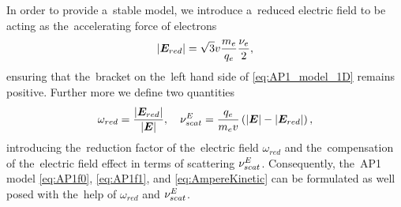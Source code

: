 In order to provide a~stable model, we introduce a~reduced electric field
to be acting as the~accelerating force of electrons
\begin{equation}
  |\boldsymbol{E}_{red}| = \sqrt{3} v\frac{m_e}{q_e}\frac{\nu_{e}}{2} ,
  \label{eq:Elimit}
\end{equation}
ensuring that the~bracket on the~left hand side of \eqref{eq:AP1_model_1D}
remains positive. Further more we define two quantities
\begin{equation}
  \omega_{red} = \frac{|\boldsymbol{E}_{red}|}{|\boldsymbol{E}|} ,\quad 
  \nu_{scat}^E = \frac{q_e}{m_ev} \left(|\boldsymbol{E}| - |\boldsymbol{E}_{red}|\right),
  \nonumber
\end{equation}
introducing the~reduction factor of the~electric field
$\omega_{red}$ and the~compensation of the~electric field effect in terms of
scattering $\nu_{scat}^E$. Consequently, the~AP1 model \eqref{eq:AP1f0}, 
\eqref{eq:AP1f1}, and \eqref{eq:AmpereKinetic} can be formulated as well posed 
with the~help of $\omega_{red}$ and $\nu_{scat}^E$. 

